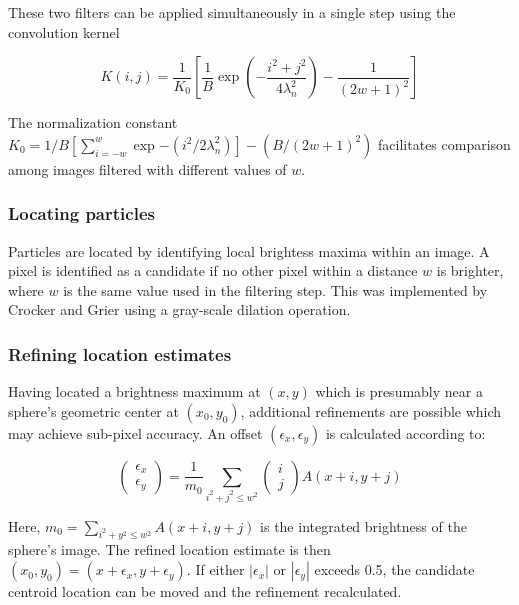 These two filters can be applied simultaneously in a single step using the convolution kernel

\begin{center}\begin{equation}K(i,j) = \frac{1}{K_0} \left[ \frac{1}{B} \exp{ \left( -\frac{i^2+j^2}{4\lambda_n^2} \right)} -
\frac{1}{(2w+1)^2} \right]
\end{equation}\end{center}

The normalization constant $K_0 = 1/B[\sum_{i=-w}^w \exp{-(i^2/2\lambda_n^2)}] - (B/(2w+1)^2)$ facilitates comparison
among images filtered with different values of $w$.

\subsubsection{Locating particles}

Particles are located by identifying local brightess maxima within an image. A pixel is identified
as a candidate if no other pixel within a distance $w$ is brighter, where $w$ is the same value used in
the filtering step. This was implemented by Crocker and Grier using a gray-scale dilation 
operation.~\cite{soille-book}

\subsubsection{Refining location estimates}

Having located a brightness maximum at $(x, y)$ which is presumably near
a sphere's geometric center at $(x_0, y_0)$, additional refinements are possible
which may achieve sub-pixel accuracy.  An offset $(\epsilon_x, \epsilon_y)$ is
calculated according to:

\begin{center}
\begin{equation}
\left( \begin{array}{c} \epsilon_x \\ \epsilon_y \end{array} \right) 
= \frac{1}{m_0}
\sum_{i^2+j^2 \leq w^2} 
\left( \begin{array}{c} i \\ j \end{array} \right)
A(x+i,y+j)
\end{equation}
\end{center}

Here, $m_0 = \sum_{i^2+y^2 \leq w^2} A(x+i,y+j)$ is the integrated brightness of the
sphere's image. The refined location estimate is then $(x_0, y_0) = (x+\epsilon_x, y+\epsilon_y)$.
If either $|\epsilon_x|$ or $|\epsilon_y|$ exceeds 0.5, the candidate centroid location can be moved and the
refinement recalculated.

